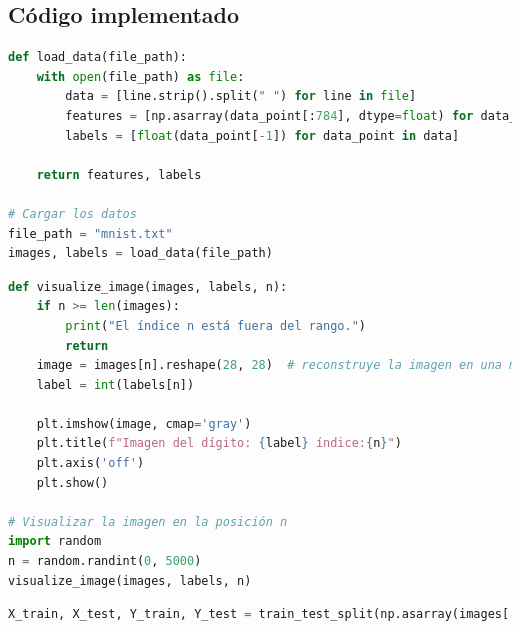 \documentclass{article}
\begin{document}
    \subsection{Código implementado}\label{subsec:codigo-implementado}

    \begin{lstlisting}[language=Python, caption={carga de datos}, label={lst:load_data}]
def load_data(file_path):
    with open(file_path) as file:
        data = [line.strip().split(" ") for line in file]
        features = [np.asarray(data_point[:784], dtype=float) for data_point in data] # pixeles de la imágen
        labels = [float(data_point[-1]) for data_point in data]                       # clase a la que pertenece

    return features, labels

# Cargar los datos
file_path = "mnist.txt"
images, labels = load_data(file_path)
    \end{lstlisting}

    \begin{lstlisting}[language=Python, caption={Visualización de datos}, label={lst:visualize_data}]
def visualize_image(images, labels, n):
    if n >= len(images):
        print("El índice n está fuera del rango.")
        return
    image = images[n].reshape(28, 28)  # reconstruye la imagen en una matriz de 28x28
    label = int(labels[n])

    plt.imshow(image, cmap='gray')
    plt.title(f"Imagen del dígito: {label} índice:{n}")
    plt.axis('off')
    plt.show()

# Visualizar la imagen en la posición n
import random
n = random.randint(0, 5000)
visualize_image(images, labels, n)
    \end{lstlisting}
    \begin{lstlisting}[language=Python, caption={Separación de datos}, label={lst:split_data}]
X_train, X_test, Y_train, Y_test = train_test_split(np.asarray(images[:1000]), labels[:1000], test_size=0.1, shuffle=True)
    \end{lstlisting}
    \noindent
\end{document}
